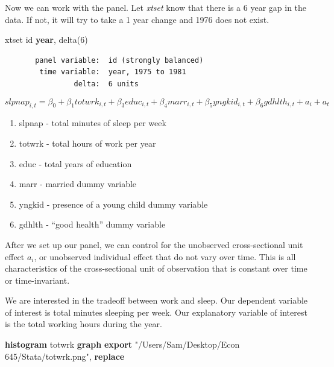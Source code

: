 \documentclass[
]{book}
\newenvironment{Shaded}{\begin{snugshade}}{\end{snugshade}}
\newcommand{\FunctionTok}[1]{\textcolor[rgb]{0.13,0.29,0.53}{\textbf{#1}}}
\newcommand{\KeywordTok}[1]{\textcolor[rgb]{0.13,0.29,0.53}{\textbf{#1}}}
\newcommand{\NormalTok}[1]{#1}
\newcommand{\StringTok}[1]{\textcolor[rgb]{0.31,0.60,0.02}{#1}}
\providecommand{\tightlist}{%
  \setlength{\itemsep}{0pt}\setlength{\parskip}{0pt}}
\begin{document}
Now we can work with the panel. Let \emph{xtset} know that there is a 6 year gap in the data. If not, it will try to take a 1 year change and 1976 does not exist.

\begin{Shaded}
\begin{Highlighting}[]
\NormalTok{xtset id }\FunctionTok{year}\NormalTok{, delta(6)}
\end{Highlighting}
\end{Shaded}

\begin{verbatim}
       panel variable:  id (strongly balanced)
        time variable:  year, 1975 to 1981
                delta:  6 units
\end{verbatim}

\[ slpnap_{i,t}=\beta_0+\beta_1 totwrk_{i,t} + \beta_3 educ_{i,t} + \beta_4 marr_{i,t} + \beta_5 yngkid_{i,t} + \beta_6 gdhlth_{i,t} + a_i + a_t \]

\begin{enumerate}
\def\labelenumi{\arabic{enumi}.}
\tightlist
\item
  slpnap - total minutes of sleep per week
\item
  totwrk - total hours of work per year
\item
  educ - total years of education
\item
  marr - married dummy variable
\item
  yngkid - presence of a young child dummy variable
\item
  gdhlth - ``good health'' dummy variable
\end{enumerate}

After we set up our panel, we can control for the unobserved cross-sectional unit effect \(a_i\), or unobserved individual effect that do not vary over time. This is all characteristics of the cross-sectional unit of observation that is constant over time or time-invariant.

We are interested in the tradeoff between work and sleep. Our dependent variable of interest is total minutes sleeping per week. Our explanatory variable of interest is the total working hours during the year.

\begin{Shaded}
\begin{Highlighting}[]
\KeywordTok{histogram}\NormalTok{ totwrk}
\KeywordTok{graph} \KeywordTok{export} \StringTok{"/Users/Sam/Desktop/Econ 645/Stata/totwrk.png"}\NormalTok{, }\KeywordTok{replace}
\end{Highlighting}
\end{Shaded}
\end{document}
